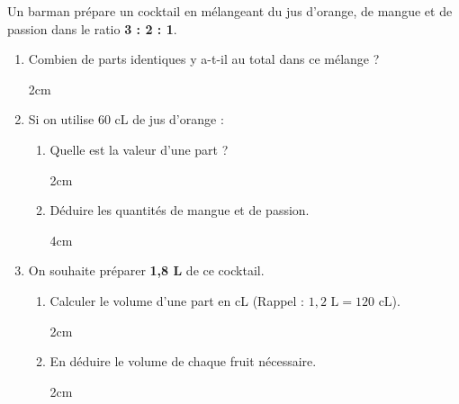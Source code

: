 \documentclass[a4paper]{book}
\begin{document}
    \begin{exemple}
        Un barman prépare un cocktail en mélangeant du jus d'orange, de mangue et de passion dans le ratio \textbf{3 : 2 : 1}.

        \medskip

        \begin{center}
        \end{center}

        \medskip

        \begin{enumerate}[leftmargin=*]
            \item Combien de parts identiques y a-t-il au total dans ce mélange ?
            \begin{ZoneReponse}{2cm}
            \end{ZoneReponse}
            
            \item Si on utilise 60 cL de jus d'orange :
            \begin{enumerate}[leftmargin=*]
                \item Quelle est la valeur d'une part ?
                \begin{ZoneReponse}{2cm}
                \end{ZoneReponse}
                
                \item Déduire les quantités de mangue et de passion.
                \begin{ZoneReponse}{4cm}
                \end{ZoneReponse}
            \end{enumerate}
            
            \item On souhaite préparer \textbf{1,8 L} de ce cocktail.
            \begin{enumerate}[leftmargin=*]
                \item Calculer le volume d'une part en cL (Rappel : $1,2\text{ L} = 120\text{ cL}$).
                \begin{ZoneReponse}{2cm}
                \end{ZoneReponse}
                
                \item En déduire le volume de chaque fruit nécessaire.
                \begin{ZoneReponse}{2cm}
                \end{ZoneReponse}
            \end{enumerate}
        \end{enumerate}
    \end{exemple}
\end{document}
